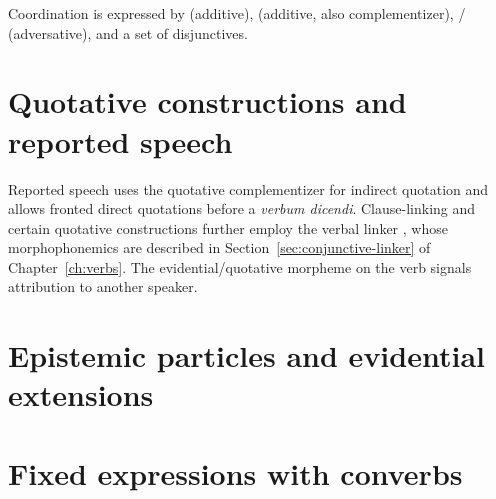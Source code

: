 
Coordination is expressed by  (additive),  (additive, also complementizer),  /  (adversative), and a set of disjunctives.

\section{Quotative constructions and reported speech}\label{sec:quotative}


Reported speech uses the quotative complementizer  for indirect quotation and allows fronted direct quotations before a \textit{verbum dicendi}. Clause-linking and certain quotative constructions further employ the verbal linker , whose morphophonemics are described in Section~\ref{sec:conjunctive-linker} of Chapter~\ref{ch:verbs}. The evidential/quotative morpheme on the verb signals attribution to another speaker.

\section{Epistemic particles and evidential extensions}\label{sec:evidential-particles}


\section{Fixed expressions with converbs}\label{sec:fixed-converbs}

